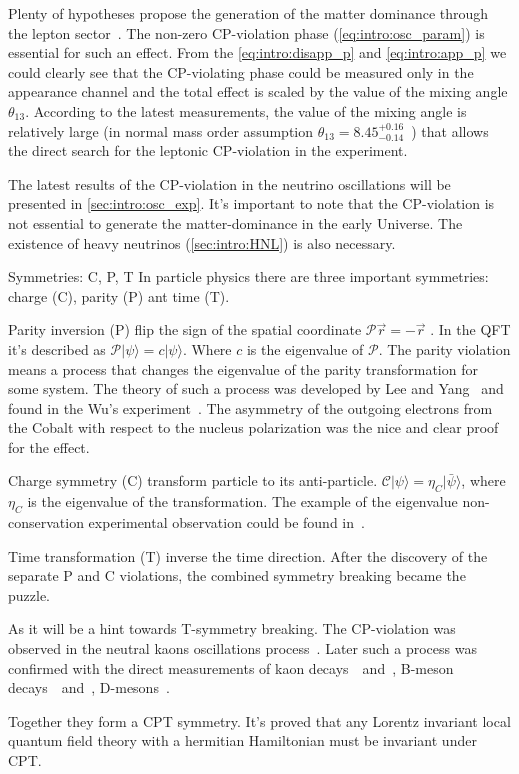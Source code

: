 \documentclass[../main.tex]{subfiles}
\begin{document}
Plenty of hypotheses propose the generation of the matter dominance through the lepton sector~\cite{Davidson2008}. The non-zero CP-violation phase (\autoref{eq:intro:osc_param}) is essential for such an effect. From the \autoref{eq:intro:disapp_p} and \autoref{eq:intro:app_p} we could clearly see that the CP-violating phase could be measured only in the appearance channel and the total effect is scaled by the value of the mixing angle $\theta_{13}$. According to the latest measurements, the value of the mixing angle is relatively large (in normal mass order assumption $\theta_{13}=8.45^{+0.16}_{-0.14}$~\cite{DeSalas2018}) that allows the direct search for the leptonic CP-violation in the experiment.

The latest results of the CP-violation in the neutrino oscillations will be presented in \autoref{sec:intro:osc_exp}. It's important to note that the CP-violation is not essential to generate the matter-dominance in the early Universe. The existence of heavy neutrinos (\autoref{sec:intro:HNL}) is also necessary.

\begin{bclogo}[couleur=blue!2, arrondi=0.1, logo=\bcinfo, nobreak=true]{Symmetries: C, P, T}
In particle physics there are three important symmetries: charge (C), parity (P) ant time (T).

Parity inversion (P) flip the sign of the spatial coordinate $\mathcal{P}\overrightarrow{r}=-\overrightarrow{r}$ . In the QFT it's described as $\mathcal{P}\lvert\psi\rangle=c\lvert\psi\rangle$. Where $c$ is the eigenvalue of $\mathcal{P}$. The parity violation means a process that changes the eigenvalue of the parity transformation for some system. The theory of such a process was developed by Lee and Yang~\cite{Lee1956} and found in the Wu's experiment~\cite{Wu1957}. The asymmetry of the outgoing electrons from the Cobalt with respect to the nucleus polarization was the nice and clear proof for the effect.

Charge symmetry (C) transform particle to its anti-particle. $\mathcal{C}\lvert\psi\rangle=\eta_{C}\lvert\bar{\psi}\rangle$, where $\eta_{C}$ is the eigenvalue of the transformation. The example of the eigenvalue non-conservation experimental observation could be found in~\cite{Gormley1968}.

Time transformation (T) inverse the time direction. After the discovery of the separate P and C violations, the combined symmetry breaking became the puzzle.

As it will be a hint towards T-symmetry breaking. The CP-violation was observed in the neutral kaons oscillations process~\cite{Christenson1964}. Later such a process was confirmed with the direct measurements of kaon decays~\cite{Alavi-Harati1999}~and~\cite{Fanti1999}, B-meson decays~\cite{Aubert2001}~and~\cite{Abe2001}, D-mesons~\cite{Aaij2019}.

Together they form a CPT symmetry. It's proved that any Lorentz invariant local quantum field theory with a hermitian Hamiltonian must be invariant under CPT.
\end{bclogo}
\end{document}
